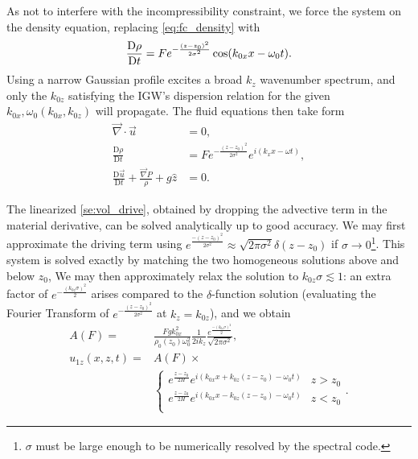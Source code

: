 \documentclass[twocolumn,
        nofootinbib,
        usenames, %
        dvipsnames %
    ]{revtex4-1}%
\newcommand*{\md}[2]{\frac{\mathrm{D}#1}{\mathrm{D}#2}}
\DeclarePairedDelimiter\p{\lparen}{\rparen}
\begin{document}
As not to interfere with the incompressibility constraint, we force the system
on the density equation, replacing \autoref{eq:fc_density} with
\begin{equation}
    \md{\rho}{t} = Fe^{-\frac{(z - z_0)^2}{2\sigma^2}}
            \cos \p*{k_{0x}x - \omega_0 t}.
\end{equation}
Using a narrow Gaussian profile excites a broad $k_z$ wavenumber spectrum, and
only the $k_{0z}$ satisfying the IGW's dispersion relation for the given
$k_{0x}, \omega_0(k_{0x}, k_{0z})$ will propagate. The fluid equations then take
form
\begin{subequations}\label{se:vol_drive}
    \begin{align}
        \vec{\nabla} \cdot \vec{u} &= 0,\\
        \md{\rho}{t} &= Fe^{-\frac{(z - z_0)^2}{2\sigma^2}}
                e^{i(k_xx - \omega t)},\\
        \md{\vec{u}}{t} + \frac{\vec{\nabla}P}{\rho}
            + g\hat{z} &= 0.
    \end{align}
\end{subequations}

The linearized \autoref{se:vol_drive}, obtained by dropping the advective term
in the material derivative, can be solved analytically up to good accuracy. We
may first approximate the driving term using $e^{\frac{-(z - z_0)^2}{2\sigma^2}}
\approx \sqrt{2\pi \sigma^2}\delta(z - z_0)$ if $\sigma \to 0$\footnote{$\sigma$
must be large enough to be numerically resolved by the spectral code.}. This
system is solved exactly by matching the two homogeneous solutions above and
below $z_0$, We may then approximately relax the solution to $k_{0z}\sigma
\lesssim 1$: an extra factor of $e^{-\frac{(k_{0z}\sigma)^2}{2}}$ arises
compared to the $\delta$-function solution (evaluating the Fourier Transform
of $e^{-\frac{(z - z_0)^2}{2\sigma^2}}$ at $k_z = k_{0z}$), and we obtain
\begin{align}
    A(F) ={}& \frac{Fgk_{0x}^2}{\rho_0(z_0)\omega_0^2}
        \frac{1}{2ik_z}\frac{e^{\frac{-(k_{0z}\sigma)^2}{2}}}
        {\sqrt{2\pi\sigma^2}},\\
    u_{1z}(x, z, t) ={}& A(F) \times\nonumber\\
        &{}\begin{cases}
        e^{\frac{z - z_0}{2H}}e^{i(k_{0x}x + k_{0z}(z - z_0) - \omega_0 t)}
            & z > z_0\\
        e^{\frac{z - z_0}{2H}}e^{i(k_{0x}x - k_{0z}(z - z_0) - \omega_0 t)}
            & z < z_0\\
    \end{cases}.\label{eq:uz_lin}
\end{align}
\end{document}
